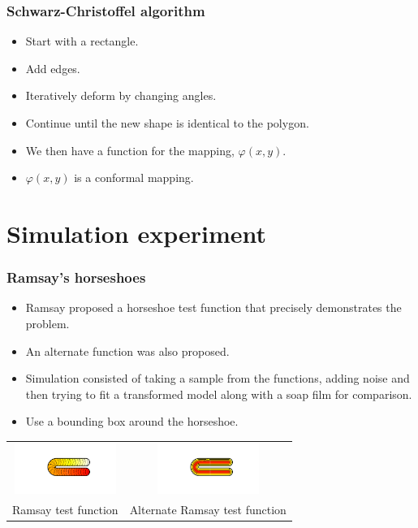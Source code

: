 \documentclass[ignorenonframetext]{beamer} %
\newcommand{\bc}{\begin{center}}
\newcommand{\ec}{\end{center}}
\newcommand{\bi}{\begin{itemize}}
\newcommand{\ei}{\end{itemize}}
\begin{document}
\begin{frame}
	\frametitle{Schwarz-Christoffel algorithm}
       \bi
         \item Start with a rectangle.
         \item Add edges.
         \item Iteratively deform by changing angles.
         \item Continue until the new shape is identical to the polygon.
         \item We then have a function for the mapping, $\varphi(x,y)$.
         \item $\varphi(x,y)$ is a conformal mapping.
        \ei 
\end{frame}


\section{Simulation experiment}

\begin{frame}
	\frametitle{Ramsay's horseshoes}
       \bi
         \item Ramsay proposed a horseshoe test function that precisely demonstrates the problem. 
         \item An alternate function was also proposed.
         \item Simulation consisted of taking a sample from the functions, adding noise and then trying to fit a transformed model along with a soap film for comparison.
         \item Use a bounding box around the horseshoe.
       \ei
       \bc\begin{tabular}{@{}cc}
          \includegraphics[width=1.3in]{figs/ramsayhorseshoe} & \includegraphics[width=1.3in]{figs/altramsayhorseshoe}\\
          Ramsay test function & Alternate Ramsay test function\\
       \end{tabular}\ec

\end{frame}
\end{document}
